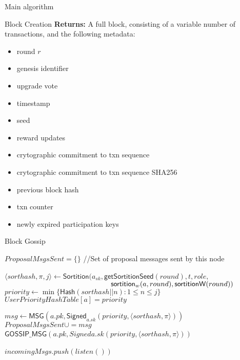 \documentclass[10pt,a4paper]{article}
\begin{document}
\begin{section}{Main algorithm}
\begin{subsection}{Block Creation}
\noindent \textbf{Returns:} A full block, consisting of a variable number of transactions, and the following metadata:
\begin{itemize}
    \item round $r$
    \item genesis identifier
    \item upgrade vote
    \item timestamp
    \item seed
    \item reward updates
    \item crytographic commitment to txn sequence
    \item crytographic commitment to txn sequence SHA256
    \item previous block hash
    \item txn counter
    \item newly expired participation keys
  \end{itemize}

\end{subsection}
\begin{subsection}{Block Gossip}

\begin{algorithm}
    \begin{algorithmic}[1]
        \State $ProposalMsgsSent = \{\}$ //Set of proposal messages sent by this node

            \State $\langle sorthash, \pi, j\rangle\gets 
            \mathsf{Sortition}(
                a_{sk}, 
                \mathsf{getSortitionSeed}(round), 
                t, 
                role, $ \newline
                ${}$ ${\hskip 5.2cm}\mathsf{sortition}_w(a, round), 
                \mathsf{sortitionW}(round)
            )$
                \State $priority \gets \min\{\mathsf{Hash}(sorthash || n):1\le n\le j\}$
                \State $UserPriorityHashTable[a] = priority$

                \State $msg \gets \mathsf{MSG}(a.pk, \mathsf{Signed}_{a.sk}(priority, \langle sorthash, \pi\rangle))$
                \State $ProposalMsgsSent \cup= msg$
                \State $\mathsf{GOSSIP\_MSG}(a.pk, Signed{a.sk}(priority, \langle sorthash, \pi\rangle))$
            \EndIf
        \EndFor\

            \State $incomingMsgs.push(listen())$
        \EndWhile\


\end{algorithmic}
\end{algorithm}
\end{subsection}
\end{section}
\end{document}

